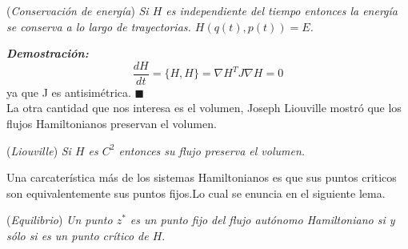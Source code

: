 \begin{lem}(\emph{\textit{Conservación de energía}})
\textit{Si $H$ es independiente del tiempo entonces la energía se conserva a lo largo de trayectorias. $H(q(t),p(t))=E$.}
\end{lem}
\textit{\textbf{Demostración:}}
\begin{equation*}
\frac{dH}{dt}=\lbrace H, H \rbrace = \nabla H^{T} J \nabla H=0  
\end{equation*}
ya que J es antisimétrica. $\blacksquare$ \\

La otra cantidad que nos interesa es el volumen, Joseph Liouville mostró que los flujos Hamiltonianos preservan el volumen.

\begin{lem}(\emph{\textit{Liouville}})
\textit{Si $H$ es $C^{2}$ entonces su flujo preserva el volumen.}
\end{lem}

Una carcaterística más de los sistemas Hamiltonianos es que sus puntos criticos son equivalentemente sus puntos fijos.Lo cual se enuncia en el siguiente lema. 
\begin{lem}(\emph{Equilibrio})
\textit{Un punto $z^{*}$ es un punto fijo del flujo autónomo Hamiltoniano si y sólo si es un punto crítico de $H$}.
\end{lem}

